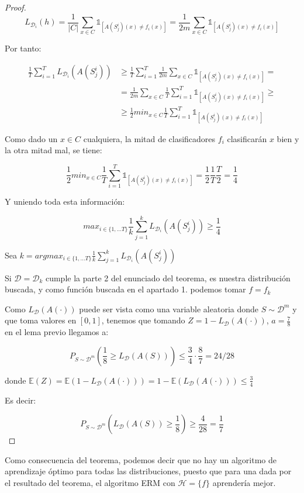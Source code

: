 \documentclass[11pt]{article}
\begin{document}
\begin{proof}
\[L_{\mathcal{D}_i} (h) = \frac{1}{|C|} \sum_{x\in C} \mathds{1}_{[A(S^i_j)(x) \neq f_i(x)]} = \frac{1}{2m} \sum_{x \in C} \mathds{1}_{[A(S^i_j)(x) \neq f_i(x)]}\]


Por tanto:

\begin{align*}
\frac{1}{T} \sum_{i=1}^{T}  L_{\mathcal{D}_i} (A(S_j^i)) &\ge
\frac{1}{T} \sum_{i=1}^{T}  \frac{1}{2m} \sum_{x \in C} \mathds{1}_{[A(S^i_j)(x) \neq f_i(x)]} = \\
&= \frac{1}{2m} \sum_{x \in C} \frac{1}{T} \sum_{i=1}^{T}  \mathds{1}_{[A(S^i_j)(x) \neq f_i(x)]} \ge \\
&\ge \frac{1}{2} min_{x\in C} \frac{1}{T} \sum_{i=1}^{T}  \mathds{1}_{[A(S^i_j)(x) \neq f_i(x)]}
\end{align*}


Como dado un $x\in C$ cualquiera, la mitad de clasificadores $f_i$ clasificarán $x$ bien y la otra mitad mal, se tiene:

\[\frac{1}{2} min_{x\in C} \frac{1}{T} \sum_{i=1}^{T}  \mathds{1}_{[A(S^i_j)(x) \neq f_i(x)]} = \frac{1}{2} \frac{1}{T} \frac{T}{2} = \frac{1}{4}\]

Y uniendo toda esta información:

\[max_{i \in \{1,\ldots T\}} \frac{1}{k} \sum_{j=1}^{k} L_{\mathcal{D}_i} (A(S_j^i)) \ge \frac{1}{4}\]

Sea $k = argmax_{i \in \{1,\ldots T\}} \frac{1}{k} \sum_{j=1}^{k} L_{\mathcal{D}_i} (A(S_j^i))$

Si $\mathcal{D} = \mathcal{D}_k$ cumple la parte 2 del enunciado del teorema, es nuestra distribución buscada, y como función buscada en el apartado 1. podemos tomar $f=f_k$

Como $L_{\mathcal{D}} (A(\cdot))$ puede ser vista como una variable aleatoria donde $S \sim \mathcal{D}^m$ y que toma valores en $[0,1]$, tenemos que tomando $Z = 1-L_{\mathcal{D}}(A(\cdot))$, $a=\frac{7}{8}$ en el lema previo llegamos a:

\[P_{S\sim \mathcal{D}^m} \left(\frac{1}{8} \ge L_{\mathcal{D}}(A(S)) \right) \le \frac{3}{4} \cdot \frac{8}{7} = 24/28\]

donde $\mathbb{E}(Z) = \mathbb{E} (1 - L_{\mathcal{D}}(A(\cdot))) = 1 - \mathbb{E} (L_{\mathcal{D}}(A(\cdot))) \le \frac{3}{4}$

Es decir:

\[P_{S\sim \mathcal{D}^m} \left( L_{\mathcal{D}}(A(S)) \ge \frac{1}{8} \right) \ge \frac{4}{28} = \frac{1}{7}\]
\end{proof}


Como consecuencia del teorema, podemos decir que no hay un algoritmo de aprendizaje óptimo para todas las distribuciones, puesto que para una dada por el resultado del teorema, el algoritmo ERM con $\mathcal{H} = \{f\}$ aprendería mejor.




\end{document}
